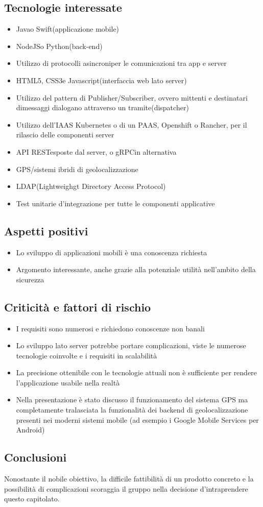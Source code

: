 \subsection{Tecnologie interessate}
\begin{itemize}
	\item Java\glo o Swift\glo (applicazione mobile)
	\item NodeJS\glo o Python\glo (back-end\glo)
	\item Utilizzo di protocolli asincroni\glosp per le comunicazioni tra app e server
	\item HTML5\glo, CSS3\glo e Javascript\glo (interfaccia web lato server)
	\item Utilizzo del pattern di Publisher/Subscriber\glo, ovvero mittenti e destinatari dimessaggi dialogano attraverso un tramite(dispatcher)
	\item Utilizzo dell’IAAS Kubernetes o di un PAAS, Openshift o Rancher, per il rilascio delle componenti server
	\item API REST\glosp esposte dal server, o gRPC\glo in alternativa
	\item GPS\glo/sistemi ibridi di geolocalizzazione
	\item LDAP\glo (Lightweighgt Directory Access Protocol)
	\item Test unitari\glosp e d'integrazione per tutte le componenti applicative
\end{itemize}

\subsection{Aspetti positivi}
\begin{itemize}
	\item Lo sviluppo di applicazioni mobili è una conoscenza richiesta
	\item Argomento interessante, anche grazie alla potenziale utilità nell'ambito della sicurezza
\end{itemize}

\subsection{Criticità e fattori di rischio}
\begin{itemize}
	\item I requisiti sono numerosi e richiedono conoscenze non banali
	\item Lo sviluppo lato server potrebbe portare complicazioni, viste le numerose tecnologie coinvolte e i requisiti in scalabilità
	\item La precisione ottenibile con le tecnologie attuali non è sufficiente per rendere l’applicazione usabile nella realtà
	\item Nella presentazione è stato discusso il funzionamento del sistema GPS ma completamente tralasciata la funzionalità dei backend di geolocalizzazione presenti nei moderni sistemi mobile (ad esempio i Google Mobile Services per Android)
\end{itemize}

\subsection{Conclusioni}
Nonostante il nobile obiettivo, la difficile fattibilità di un prodotto concreto e la possibilità di complicazioni scoraggia il gruppo nella decisione d'intraprendere questo capitolato.
